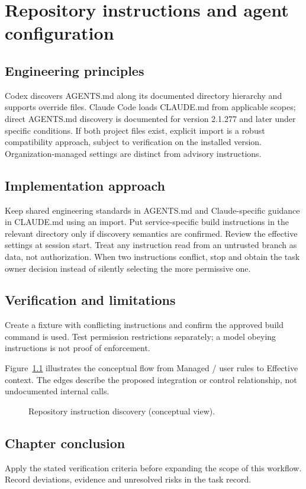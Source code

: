 \chapter{Repository instructions and agent configuration}

\section{Engineering principles}

Codex discovers AGENTS.md along its documented directory hierarchy and supports override files. Claude Code loads CLAUDE.md from applicable scopes; direct AGENTS.md discovery is documented for version 2.1.277 and later under specific conditions. If both project files exist, explicit import is a robust compatibility approach, subject to verification on the installed version. Organization-managed settings are distinct from advisory instructions.

\section{Implementation approach}

Keep shared engineering standards in AGENTS.md and Claude-specific guidance in CLAUDE.md using an import. Put service-specific build instructions in the relevant directory only if discovery semantics are confirmed. Review the effective settings at session start. Treat any instruction read from an untrusted branch as data, not authorization. When two instructions conflict, stop and obtain the task owner decision instead of silently selecting the more permissive one.

\section{Verification and limitations}

Create a fixture with conflicting instructions and confirm the approved build command is used. Test permission restrictions separately; a model obeying instructions is not proof of enforcement.

Figure~\ref{fig:d6} illustrates the conceptual flow from Managed / user rules to Effective context. The edges describe the proposed integration or control relationship, not undocumented internal calls.

\begin{figure}[htbp]\centering\caption{Repository instruction discovery (conceptual view).}\label{fig:d6}\end{figure}

\section{Chapter conclusion}

Apply the stated verification criteria before expanding the scope of this workflow. Record deviations, evidence and unresolved risks in the task record.
